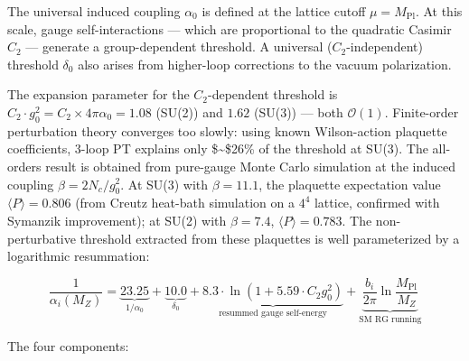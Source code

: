 \documentclass[
  11pt,
]{article}
\begin{document}
The universal induced coupling \(\alpha_0\) is defined at the lattice
cutoff \(\mu = M_{\text{Pl}}\). At this scale, gauge self-interactions
--- which are proportional to the quadratic Casimir \(C_2\) --- generate
a group-dependent threshold. A universal (\(C_2\)-independent) threshold
\(\delta_0\) also arises from higher-loop corrections to the vacuum
polarization.

The expansion parameter for the \(C_2\)-dependent threshold is
\(C_2 \cdot g_0^2 = C_2 \times 4\pi\alpha_0 = 1.08\) (SU(2)) and
\(1.62\) (SU(3)) --- both \(\mathcal{O}(1)\). Finite-order perturbation
theory converges too slowly: using known Wilson-action plaquette
coefficients, 3-loop PT explains only \$\sim\$26\% of the threshold at
SU(3). The all-orders result is obtained from pure-gauge Monte Carlo
simulation at the induced coupling \(\beta = 2N_c/g_0^2\). At SU(3) with
\(\beta = 11.1\), the plaquette expectation value
\(\langle P \rangle = 0.806\) (from Creutz heat-bath simulation on a
\(4^4\) lattice, confirmed with Symanzik improvement); at SU(2) with
\(\beta = 7.4\), \(\langle P \rangle = 0.783\). The non-perturbative
threshold extracted from these plaquettes is well parameterized by a
logarithmic resummation:

\[\frac{1}{\alpha_i(M_Z)} = \underbrace{23.25}_{1/\alpha_0} + \underbrace{10.0}_{\delta_0} + \underbrace{8.3 \cdot \ln\!\left(1 + 5.59 \cdot C_2 g_0^2\right)}_{\text{resummed gauge self-energy}} + \underbrace{\frac{b_i}{2\pi}\ln\frac{M_{\text{Pl}}}{M_Z}}_{\text{SM RG running}}\]

The four components:
\end{document}
